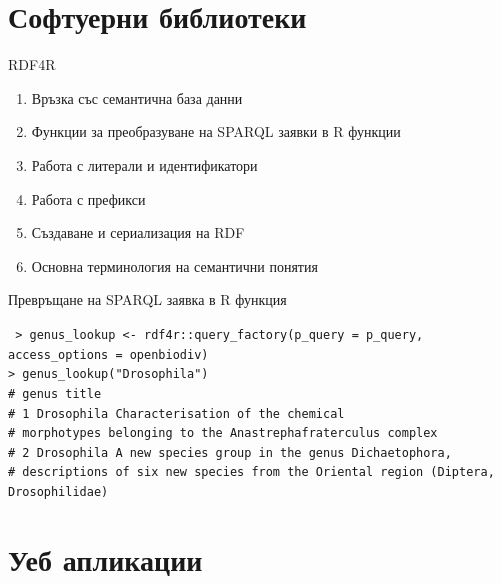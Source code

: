 \documentclass[bulgarian]{beamer}
\begin{document}
\section{Софтуерни библиотеки}

\begin{frame}{RDF4R}

\begin{enumerate}
    \item Връзка със семантична база данни
    \item Функции за преобразуване на SPARQL заявки в R функции
    \item Работа с литерали и идентификатори
    \item Работа с префикси
    \item Създаване и сериализация на RDF
    \item Основна терминология на семантични понятия
\end{enumerate}
\end{frame}

\begin{frame}{Превръщане на SPARQL заявка в R функция}

\tt
> genus\_lookup <- rdf4r::query\_factory(p\_query = p\_query, access\_options = openbiodiv)\\
> genus\_lookup("Drosophila")\\
#    genus title\\
# 1   Drosophila  Characterisation of the chemical\\
# morphotypes belonging to the Anastrephafraterculus complex\\
# 2   Drosophila                A new species group in the genus Dichaetophora,\\
# descriptions of six new species from the Oriental region (Diptera, Drosophilidae)
\end{frame}

\section{Уеб апликации}
\end{document}

